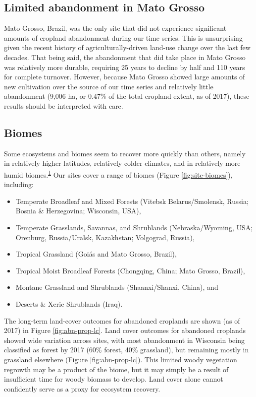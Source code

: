 \documentclass[
]{article}
\providecommand{\tightlist}{%
  \setlength{\itemsep}{0pt}\setlength{\parskip}{0pt}}
\begin{document}
\hypertarget{mato-grosso}{%
\subsection{Limited abandonment in Mato Grosso}\label{mato-grosso}}

Mato Grosso, Brazil, was the only site that did not experience significant amounts of cropland abandonment during our time series.
This is unsurprising given the recent history of agriculturally-driven land-use change over the last few decades.
That being said, the abandonment that did take place in Mato Grosso was relatively more durable, requiring 25 years to decline by half and 110 years for complete turnover.
However, because Mato Grosso showed large amounts of new cultivation over the source of our time series and relatively little abandonment (9,006 ha, or 0.47\% of the total cropland extent, as of 2017), these results should be interpreted with care.

\hypertarget{biomes}{%
\subsection{Biomes}\label{biomes}}

Some ecosystems and biomes seem to recover more quickly than others, namely in relatively higher latitudes, relatively colder climates, and in relatively more humid biomes.\textsuperscript{\protect\hyperlink{ref-Prach2018}{1}}
Our sites cover a range of biomes (Figure \ref{fig:site-biomes}), including:

\begin{itemize}
\tightlist
\item
  Temperate Broadleaf and Mixed Forests (Vitebsk Belarus/Smolensk, Russia; Bosnia \& Herzegovina; Wisconsin, USA),
\item
  Temperate Grasslands, Savannas, and Shrublands (Nebraska/Wyoming, USA; Orenburg, Russia/Uralsk, Kazakhstan; Volgograd, Russia),
\item
  Tropical Grassland (Goiás and Mato Grosso, Brazil),
\item
  Tropical Moist Broadleaf Forests (Chongqing, China; Mato Grosso, Brazil),
\item
  Montane Grassland and Shrublands (Shaanxi/Shanxi, China), and
\item
  Deserts \& Xeric Shrublands (Iraq).
\end{itemize}

The long-term land-cover outcomes for abandoned croplands are shown (as of 2017) in Figure \ref{fig:abn-prop-lc}.
Land cover outcomes for abandoned croplands showed wide variation across sites, with most abandonment in Wisconsin being classified as forest by 2017 (60\% forest, 40\% grassland), but remaining mostly in grassland elsewhere (Figure \ref{fig:abn-prop-lc}).
This limited woody vegetation regrowth may be a product of the biome, but it may simply be a result of insufficient time for woody biomass to develop.
Land cover alone cannot confidently serve as a proxy for ecosystem recovery.
\end{document}
